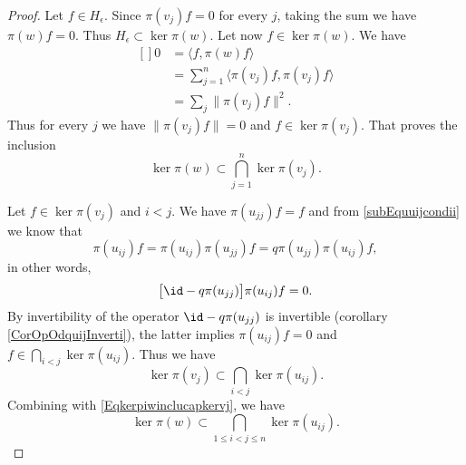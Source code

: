 \begin{proof}
    Let $f\in H_{\epsilon}$. Since $\pi(v_j)f=0$ for every $j$, taking the sum we have $\pi(w)f=0$. Thus \( H_{\epsilon}\subset\ker\pi(w)\). Let now $f\in\ker\pi(w)$. We have
    \begin{equation}
        \begin{aligned}[]
            0&=\langle f, \pi(w)f\rangle \\
            &=\sum_{j=1}^n\langle \pi(v_j)f, \pi(v_j)f\rangle \\
            &=\sum_j\| \pi(v_j)f \|^2.
        \end{aligned}
    \end{equation}
    Thus for every $j$ we have $\| \pi(v_j)f \|=0$ and $f\in\ker\pi(v_j)$. That proves the inclusion
    \begin{equation}        \label{Eqkerpiwinclucapkervj}
        \ker\pi(w)\subset\bigcap_{j=1}^n\ker\pi(v_j).
    \end{equation}
    
    Let $f\in\ker\pi(v_j)$ and \( i<j\). We have $\pi(u_{jj})f=f$ and from \eqref{subEquuijcondii} we know that
    \begin{equation}
        \pi(u_{ij})f=\pi(u_{ij})\pi(u_{jj})f=q\pi(u_{jj})\pi(u_{ij})f,
    \end{equation}
    in other words,
    \begin{equation}
        \big[ \id-q\pi(u_{jj}) \big]\pi(u_{ij})f=0.
    \end{equation}
    By invertibility of the operator $\id-q\pi(u_{jj})$ is invertible (corollary \ref{CorOpOdquijInverti}), the latter implies $\pi(u_{ij})f=0$ and $f\in\bigcap_{i<j}\ker\pi(u_{ij})$. Thus we have
    \begin{equation}        \label{Eqketpivjsubipyjketpiuij}
        \ker\pi(v_j)\subset\bigcap_{i<j}\ker\pi(u_{ij}).
    \end{equation}
    Combining with \eqref{Eqkerpiwinclucapkervj}, we have
    \begin{equation}        \label{EqIntSubSintkerkera}
        \ker\pi(w)\subset\bigcap_{1\leq i<j\leq n}\ker\pi(u_{ij}).
    \end{equation}
    

\end{proof}
